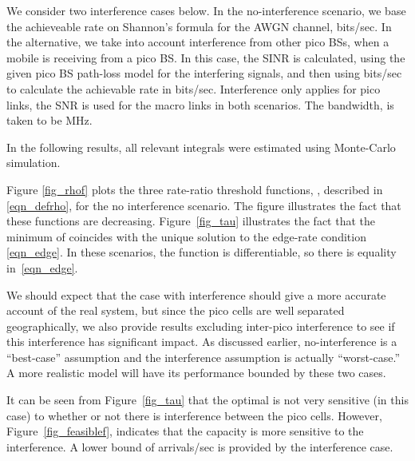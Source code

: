 \documentclass[12pt, draftcls, onecolumn]{IEEEtranTCOM}
\begin{document}
{We consider two interference cases below. In the no-interference scenario, we base the achieveable rate on Shannon's formula for the AWGN channel,  bits/sec. In the alternative, we take into account interference from other pico BSs, when a mobile is receiving from a pico BS. In this case, the SINR is calculated, using the given pico BS path-loss model for the  interfering signals, and then using  bits/sec to calculate the achievable rate in bits/sec. Interference only applies for pico links, the SNR is used for the macro links in both scenarios. The bandwidth,  is taken to be  MHz.


In the following results, all relevant integrals were estimated using Monte-Carlo simulation.

Figure \ref{fig_rhof} plots the three rate-ratio threshold functions, , described in \eqref{eqn_defrho}, for the no interference scenario. The figure illustrates the fact that these functions are decreasing. Figure~\ref{fig_tau} illustrates the fact that the minimum of  coincides with the unique solution to the edge-rate condition \eqref{eqn_edge}. In these scenarios, the function  is differentiable, so there is equality in~\eqref{eqn_edge}.

 \begin{figure}[t]
    \centering
    \begin{floatrow}
    \end{floatrow}
  \end{figure}



We should expect that the case with interference should give a more accurate account of the real system, but since the pico cells are well separated geographically, we also provide results excluding inter-pico interference to see if this interference has significant impact. As discussed earlier, no-interference is a ``best-case'' assumption and  the interference assumption is actually ``worst-case.'' A more realistic model will have its performance bounded by these two cases.

It can be seen from Figure~\ref{fig_tau} that the optimal  is not very sensitive (in this case) to whether or not there is interference between the pico cells. However, Figure~\ref{fig_feasiblef}, indicates that the capacity is more sensitive to the interference. A lower bound of  arrivals/sec is provided by the interference case. 

}
\end{document}
